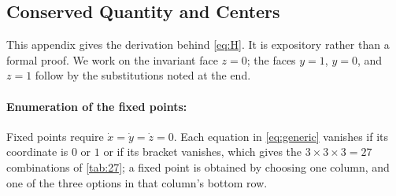 \documentclass[10pt]{article}
\begin{document}
\begin{appendices}
\section{Conserved Quantity and Centers}\label{app:hamiltonian}
This appendix gives the derivation behind \cref{eq:H}. It is expository rather than a formal proof. We work on the invariant face $z=0$; the faces $y=1$, $y=0$, and $z=1$ follow by the substitutions noted at the end.

\paragraph{Enumeration of the fixed points:} Fixed points require $\dot x=\dot y=\dot z=0$. Each equation in \cref{eq:generic} vanishes if its coordinate is $0$ or $1$ or if its bracket vanishes, which gives the $3\times3\times3=27$ combinations of \cref{tab:27}; a fixed point is obtained by choosing one column, and one of the three options in that column's bottom row.


\end{appendices}
\end{document}
